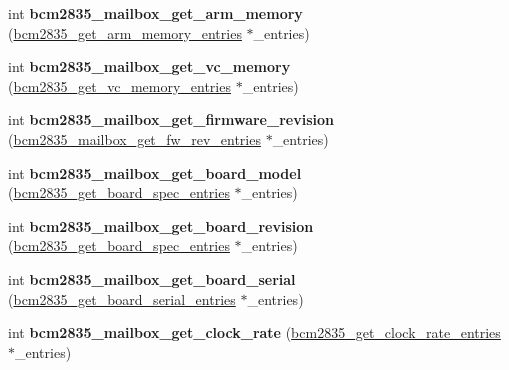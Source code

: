 \begin{DoxyCompactItemize}
\mbox{\label{group__raspberrypi__vc_ga1a4b7a092abb3a5528474422c34c45a5}} 
int {\bfseries bcm2835\+\_\+mailbox\+\_\+get\+\_\+arm\+\_\+memory} (\mbox{\hyperlink{structbcm2835__get__arm__memory__entries}{bcm2835\+\_\+get\+\_\+arm\+\_\+memory\+\_\+entries}} $\ast$\+\_\+entries)
\item 
\mbox{\label{group__raspberrypi__vc_ga99eb470553dfcd2dcb04545383279319}} 
int {\bfseries bcm2835\+\_\+mailbox\+\_\+get\+\_\+vc\+\_\+memory} (\mbox{\hyperlink{structbcm2835__get__vc__memory__entries}{bcm2835\+\_\+get\+\_\+vc\+\_\+memory\+\_\+entries}} $\ast$\+\_\+entries)
\item 
\mbox{\label{group__raspberrypi__vc_ga2ece1cebfbfc51ed6cf3f5f02b7713db}} 
int {\bfseries bcm2835\+\_\+mailbox\+\_\+get\+\_\+firmware\+\_\+revision} (\mbox{\hyperlink{structbcm2835__mailbox__get__fw__rev__entries}{bcm2835\+\_\+mailbox\+\_\+get\+\_\+fw\+\_\+rev\+\_\+entries}} $\ast$\+\_\+entries)
\item 
\mbox{\label{group__raspberrypi__vc_ga19eb88fe928f1e349cdde3a66742e897}} 
int {\bfseries bcm2835\+\_\+mailbox\+\_\+get\+\_\+board\+\_\+model} (\mbox{\hyperlink{structbcm2835__get__board__spec__entries}{bcm2835\+\_\+get\+\_\+board\+\_\+spec\+\_\+entries}} $\ast$\+\_\+entries)
\item 
\mbox{\label{group__raspberrypi__vc_ga8867015d43e7b89886e5629aa050c3a0}} 
int {\bfseries bcm2835\+\_\+mailbox\+\_\+get\+\_\+board\+\_\+revision} (\mbox{\hyperlink{structbcm2835__get__board__spec__entries}{bcm2835\+\_\+get\+\_\+board\+\_\+spec\+\_\+entries}} $\ast$\+\_\+entries)
\item 
\mbox{\label{group__raspberrypi__vc_gaf824406180bec482f17f146c046a9ef3}} 
int {\bfseries bcm2835\+\_\+mailbox\+\_\+get\+\_\+board\+\_\+serial} (\mbox{\hyperlink{structbcm2835__get__board__serial__entries}{bcm2835\+\_\+get\+\_\+board\+\_\+serial\+\_\+entries}} $\ast$\+\_\+entries)
\item 
\mbox{\label{group__raspberrypi__vc_ga45a103f58cdd60391e313fba26f35a7d}} 
int {\bfseries bcm2835\+\_\+mailbox\+\_\+get\+\_\+clock\+\_\+rate} (\mbox{\hyperlink{structbcm2835__get__clock__rate__entries}{bcm2835\+\_\+get\+\_\+clock\+\_\+rate\+\_\+entries}} $\ast$\+\_\+entries)
\end{DoxyCompactItemize}
